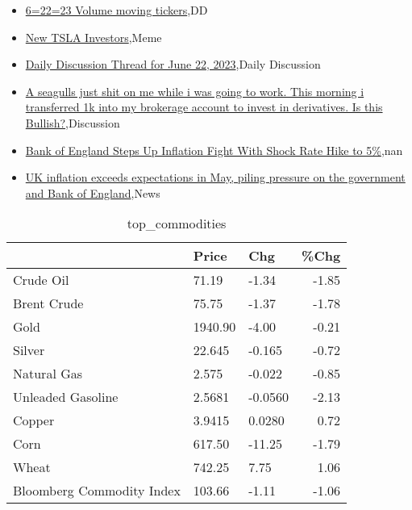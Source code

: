 \documentclass{article}%
\begin{document}
%
\begin{itemize}%
\item%
\href{https://reddit.com/r/wallstreetbets/comments/14g1qy2/62223\_volume\_moving\_tickers/}{6=22=23 Volume moving tickers},DD%
\item%
\href{https://reddit.com/r/wallstreetbets/comments/14g1cwm/new\_tsla\_investors/}{New TSLA Investors},Meme%
\item%
\href{https://reddit.com/r/wallstreetbets/comments/14fzatd/daily\_discussion\_thread\_for\_june\_22\_2023/}{Daily Discussion Thread for June 22, 2023},Daily Discussion%
\item%
\href{https://reddit.com/r/StockMarket/comments/14fz7q5/a\_seagulls\_just\_shit\_on\_me\_while\_i\_was\_going\_to/}{A seagulls just shit on me while i was going to work. This morning i transferred 1k into my brokerage account to invest in derivatives. Is this Bullish?},Discussion%
\item%
\href{https://reddit.com/r/Economics/comments/14g0nwb/bank\_of\_england\_steps\_up\_inflation\_fight\_with/}{Bank of England Steps Up Inflation Fight With Shock Rate Hike to 5\%},nan%
\item%
\href{https://reddit.com/r/Economics/comments/14f40tx/uk\_inflation\_exceeds\_expectations\_in\_may\_piling/}{UK inflation exceeds expectations in May, piling pressure on the government and Bank of England},News%
\end{itemize}%


\begin{table}[htbp]%
\caption{top\_commodities}%
\centering%
\begin{adjustbox}{width=1\textwidth}%
\begin{tabular}{lllr}
\toprule
                          &   Price &     Chg &  \%Chg \\
\midrule
               Crude Oil  &   71.19 &   -1.34 & -1.85 \\
             Brent Crude  &   75.75 &   -1.37 & -1.78 \\
                    Gold  & 1940.90 &   -4.00 & -0.21 \\
                  Silver  &  22.645 &  -0.165 & -0.72 \\
             Natural Gas  &   2.575 &  -0.022 & -0.85 \\
       Unleaded Gasoline  &  2.5681 & -0.0560 & -2.13 \\
                  Copper  &  3.9415 &  0.0280 &  0.72 \\
                    Corn  &  617.50 &  -11.25 & -1.79 \\
                   Wheat  &  742.25 &    7.75 &  1.06 \\
Bloomberg Commodity Index &  103.66 &   -1.11 & -1.06 \\
\bottomrule
\end{tabular}
%
\end{adjustbox}%
\end{table}
\end{document}
